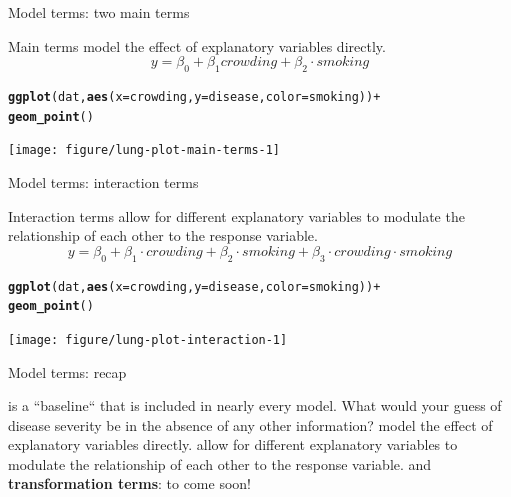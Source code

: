 \documentclass[table]{beamer}\usepackage[]{graphicx}\usepackage[]{color}
\makeatletter
\newcommand{\hlopt}[1]{\textcolor[rgb]{0,0,0}{#1}}%
\newcommand{\hlstd}[1]{\textcolor[rgb]{0.345,0.345,0.345}{#1}}%
\newcommand{\hlkwc}[1]{\textcolor[rgb]{0.333,0.667,0.333}{#1}}%
\newcommand{\hlkwd}[1]{\textcolor[rgb]{0.737,0.353,0.396}{\textbf{#1}}}%
\newenvironment{kframe}{%
 \def\at@end@of@kframe{}%
 \ifinner\ifhmode%
  \def\at@end@of@kframe{\end{minipage}}%
  \begin{minipage}{\columnwidth}%
 \fi\fi%
 \def\FrameCommand##1{\hskip\@totalleftmargin \hskip-\fboxsep
 \colorbox{shadecolor}{##1}\hskip-\fboxsep
     \hskip-\linewidth \hskip-\@totalleftmargin \hskip\columnwidth}%
 \MakeFramed {\advance\hsize-\width
   \@totalleftmargin\z@ \linewidth\hsize
   \@setminipage}}%
 {\par\unskip\endMakeFramed%
 \at@end@of@kframe}
\newenvironment{knitrout}{}{} %
\makeatother
\begin{document}
\begin{frame}[fragile]{Model terms: two main terms}

Main terms model the effect of explanatory variables directly. $$y = \beta_0 + \beta_1 crowding + \beta_2 \cdot smoking$$

\begin{knitrout}\footnotesize
{}\color{fgcolor}\begin{kframe}
\begin{alltt}
\hlkwd{ggplot}\hlstd{(dat,} \hlkwd{aes}\hlstd{(}\hlkwc{x}\hlstd{=crowding,} \hlkwc{y}\hlstd{=disease,} \hlkwc{color}\hlstd{=smoking))} \hlopt{+}
  \hlkwd{geom_point}\hlstd{()}
\end{alltt}
\end{kframe}
\texttt{[image: figure/lung-plot-main-terms-1]} 
\end{knitrout}

\end{frame}



\begin{frame}[fragile]{Model terms: interaction terms}

Interaction terms allow for different explanatory variables to modulate the relationship of each other to the response variable. $$y = \beta_0 + \beta_1 \cdot crowding + \beta_2 \cdot smoking + \beta_3 \cdot crowding \cdot smoking$$

\begin{knitrout}\footnotesize
{}\color{fgcolor}\begin{kframe}
\begin{alltt}
\hlkwd{ggplot}\hlstd{(dat,} \hlkwd{aes}\hlstd{(}\hlkwc{x}\hlstd{=crowding,} \hlkwc{y}\hlstd{=disease,} \hlkwc{color}\hlstd{=smoking))} \hlopt{+}
  \hlkwd{geom_point}\hlstd{()}
\end{alltt}
\end{kframe}
\texttt{[image: figure/lung-plot-interaction-1]} 
\end{knitrout}

\end{frame}



\begin{frame}[fragile]{Model terms: recap}

\bi
   is a ``baseline`` that is included in nearly every model. What would your guess of disease severity be in the absence of any other information?
   model the effect of explanatory variables directly.
   allow for different explanatory variables to modulate the relationship of each other to the response variable.
   and {\bf transformation terms}: to come soon!
\ei

\end{frame}
\end{document}
